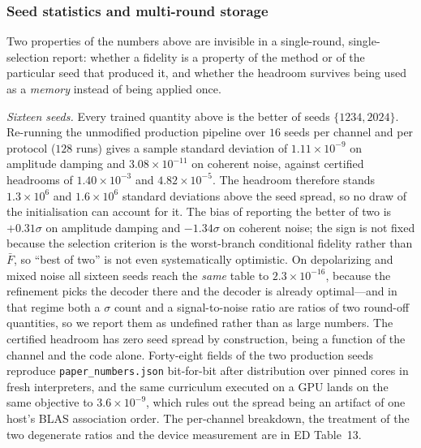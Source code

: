 \documentclass[aps,prxquantum,reprint,superscriptaddress]{revtex4-2}
\begin{document}
\subsubsection*{Seed statistics and multi-round storage}

Two properties of the numbers above are invisible in a single-round,
single-selection report: whether a fidelity is a property of the method or of
the particular seed that produced it, and whether the headroom survives being
used as a \emph{memory} instead of being applied once.

\emph{Sixteen seeds.} Every trained quantity above is the better of seeds
$\{1234,2024\}$. Re-running the unmodified production pipeline over $16$ seeds
per channel and per protocol ($128$ runs) gives a sample standard deviation of
$1.11\times10^{-9}$ on amplitude damping and $3.08\times10^{-11}$ on coherent
noise, against certified headrooms of $1.40\times10^{-3}$ and
$4.82\times10^{-5}$. The headroom therefore stands
$1.3\times10^{6}$ and $1.6\times10^{6}$ standard deviations above the seed
spread, so no draw of the initialisation can account for it. The bias of
reporting the better of two is $+0.31\sigma$ on amplitude damping and
$-1.34\sigma$ on coherent noise; the sign is not fixed because the selection
criterion is the worst-branch conditional fidelity rather than $\bar F$, so
``best of two'' is not even systematically optimistic. On depolarizing and mixed
noise all sixteen seeds reach the \emph{same} table to $2.3\times10^{-16}$,
because the refinement picks the decoder there and the decoder is already
optimal---and in that regime both a $\sigma$ count and a signal-to-noise ratio
are ratios of two round-off quantities, so we report them as undefined rather
than as large numbers. The certified headroom has zero seed spread by
construction, being a function of the channel and the code alone. Forty-eight
fields of the two production seeds reproduce \texttt{paper\_numbers.json}
bit-for-bit after distribution over pinned cores in fresh interpreters, and the
same curriculum executed on a GPU lands on the same objective to
$3.6\times10^{-9}$, which rules out the spread being an artifact of one host's
BLAS association order. The per-channel breakdown, the treatment of the two
degenerate ratios and the device measurement are in ED Table~13.
\end{document}
